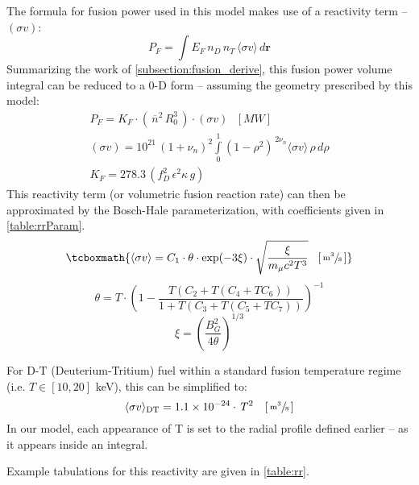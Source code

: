The formula for fusion power used in this model makes use of a reactivity term -- $(\sigma v)$:\cite{jeff}
\begin{equation}
	P_F = \int E_F \, n_D \, n_T \, \langle \sigma v \rangle \, d \textbf{r}
\end{equation}
Summarizing the work of \cref{subsection:fusion_derive}, this fusion power volume integral can be reduced to a 0-D form -- assuming the geometry prescribed by this model:
\begin{gather}
	P_F = K_F \cdot ( \, \overline{n}^2 \, R_0^3 \, ) \cdot (\sigma v) \ \ \ [MW] \\
	 (\sigma v) = 10^{21} \, (1+\nu_n)^2 \int\limits_0^1 ( 1 - \rho^2 ) ^ { \, 2 \nu_n} \langle \sigma v \rangle \, \rho \, d\rho \\
	K_F = 278.3 \, ( f_D^2 \, \epsilon^2 \kappa \, g )
\end{gather}
This reactivity term (or volumetric fusion reaction rate) can then be approximated by the Bosch-Hale parameterization, with coefficients given in \cref{table:rrParam}.\cite{boschhale,zach}
\begin{equation}
	\tcboxmath{
	\langle \sigma v \rangle = C_1 \cdot \theta \cdot \textnormal{exp}(-3 \xi) \cdot \sqrt{ \frac{\xi  }{m_\mu  c^2 T^3} }  \ \ \, [ \, \sfrac{ \textnormal{m}^3 }{ \textnormal{s} } \, ] }
\end{equation}
\begin{equation}
	\theta = T \cdot \left(1-\frac{T(C_2+T(C_4+TC_6))}{1+T(C_3+T(C_5+TC_7))}\right) ^{-1}
\end{equation}
\begin{equation}
	\xi = \left(\frac{B_G^2}{4\theta}\right)^{1/3}
\end{equation}

For D-T (Deuterium-Tritium) fuel within a standard fusion temperature regime (i.e. $T \in [10, 20]$ keV), this can be simplified to:\cite{zach}
\begin{equation}
		\langle\sigma v\rangle_\mathrm{DT} = 1.1\times10^{-24} \cdot  \, T^2   \ \ \ [ \, \sfrac{ \textnormal{m}^3 }{ \textnormal{s} } \, ]
\end{equation}
In our model, each appearance of T is set to the radial profile defined earlier -- as it appears inside an integral.

Example tabulations for this reactivity are given in \cref{table:rr}.\cite{zach,nrl,boschhale}

